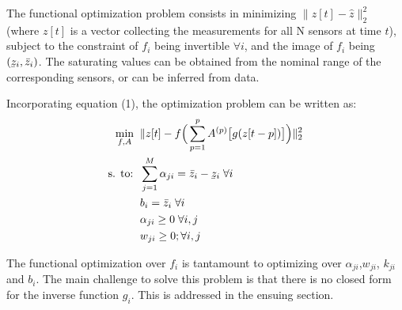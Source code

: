 The functional optimization problem consists in minimizing $\|{z}[t]-\hat z\|_{2}^{2}$ (where $z[t]$ is a vector collecting the measurements for all N sensors at time $t$), subject to the constraint of $f_i$ being invertible $\forall i$, and the image of $f_i$ being $(\ubar{z}_i, \bar{z}_i)$. The saturating values can be obtained from the nominal range of the corresponding sensors, or can be inferred from data. 
 
 Incorporating equation (1),  the optimization problem can be written as:
\begin{subequations}
\label{eq:optimization_problem}
\begin{align}
    \min _{f, A} \;\;& \| {z}[t]-f\Big(\sum_{p=1}^{p} A^{(p)}\big[g(z[t-p])\big]\Big) \|_{2}^{2} 
    \\
    \textrm{s. to:}\;\  
    & \sum_{j=1}^{M}\alpha_{j i} 
      = \bar{z}_i %
        - \ubar{z}_i %
        \; \forall i
        \label{eq:constraint_alpharange}
    \\
    & b_{i} = \bar{z}_i%
        \; \forall i
        \label{eq:constraint_barz}
    \\
    & \alpha_{j i} \geq0 
        \; \forall i, j
        \label{eq:constraint_alphapos}
        \\
    & w_{j i} \geq0 
        ; \forall i, j
        \label{eq:constraint_wpos}
\end{align}
 \end{subequations}
         
The functional optimization over $f_i$ is tantamount to optimizing over $\alpha_{j i}$,$w_{j i}$,  $k_{j i}$ and $b_{i}$. The main challenge to solve this problem is that there is no closed form for the inverse function $g_i$. This is addressed in the ensuing section.

\iffalse
\begin{lstlisting}
// Algorithm for function g implementation
def g(x,i):
  niter = 10000
  vy = 0
  for j in range(niter):
    vy = vy - (ginverse(vy,i)-x)/gprime(vy,i)  
  return vy
def gprime(x,i): 
  a=0.01
  for j in range(m):
            a = a + alpha[j][i] * sigmoid(x-k[j][i]) * (1-sigmoid(x-k[j][i])) 
  return a
def ginverse(x,i): 
  a = 0   
  for j in range(m):
      a = a + alpha[j][i] * sigmoid(x-k[j][i]) + b[i][0]
  return a
\end{lstlisting}
\fi



